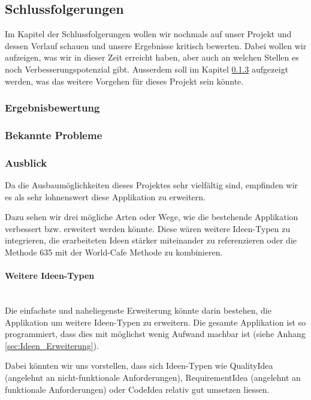 \subsection{Schlussfolgerungen}
Im Kapitel der Schlussfolgerungen wollen wir nochmals auf unser Projekt und dessen Verlauf schauen und unsere Ergebnisse kritisch bewerten. Dabei wollen wir aufzeigen, was wir in dieser Zeit erreicht haben, aber auch an welchen Stellen es noch Verbesserungspotenzial gibt. Ausserdem soll im Kapitel \ref{subsub:Ausblick} aufgezeigt werden, was das weitere Vorgehen für dieses Projekt sein könnte.

\subsubsection{Ergebnisbewertung}

\subsubsection{Bekannte Probleme}

\subsubsection{Ausblick}
\label{subsub:Ausblick}
Da die Ausbaumöglichkeiten dieses Projektes sehr vielfältig sind, empfinden wir es als sehr lohnenswert diese Applikation zu erweitern.

Dazu sehen wir drei mögliche Arten oder Wege, wie die bestehende Applikation verbessert bzw. erweitert werden könnte. Diese wären weitere Ideen-Typen zu integrieren, die erarbeiteten Ideen stärker miteinander zu referenzieren oder die Methode 635 mit der World-Cafe Methode zu kombinieren.

\paragraph*{Weitere Ideen-Typen}~\\
Die einfachste und naheliegenste Erweiterung könnte darin bestehen, die Applikation um weitere Ideen-Typen zu erweitern. Die gesamte Applikation ist so programmiert, dass dies mit möglichst wenig Aufwand machbar ist (siehe Anhang \ref{sec:Ideen_Erweiterung}). 

Dabei könnten wir uns vorstellen, dass sich Ideen-Typen wie QualityIdea (angelehnt an nicht-funktionale Anforderungen), RequirementIdea (angelehnt an funktionale Anforderungen)  oder CodeIdea relativ gut umsetzen liessen.

